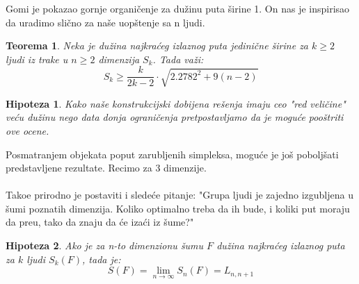 \documentclass[b1paper,portrait]{template/baposter}
\newtheorem{theorem}{Teorema}
\newtheorem*{hipoteza}{Hipoteza}
\begin{document}
\begin{poster}
{
	Gomi je pokazao gornje organi\v cenje za du\v zinu puta \v sirine 1.
	On nas je inspirisao da uradimo sli\v cno za na\v se uop\v stenje sa n ljudi.
	\begin{theorem}
		Neka je du\v zina najkra\' ceg izlaznog puta jedini\v cne \v sirine za $k\geqslant 2$ ljudi iz trake u $n\geqslant 2$ dimenzija $S_k$. Tada va\v zi:
		$$S_k\geqslant\frac{k}{2k-2}\cdot \sqrt{2.2782^2+9(n-2)}$$
	\end{theorem}
	\begin{hipoteza}
		Kako na\v se konstrukcijski dobijena re\v senja imaju ceo "red veli\v cine" ve\' cu du\v zinu nego 
		data donja ograni\v cenja pretpostavljamo da je mogu\' ce poo\v striti ove ocene. 
	\end{hipoteza}
	\vspace{0.15cm}
}

{
	Posmatranjem objekata poput zarubljenih simpleksa, mogu\' ce je jo\v s pobolj\v sati predstavljene rezultate. Recimo za 3 dimenzije.\\ \\
	Tako\dj e prirodno je postaviti i slede\' ce pitanje:
	"Grupa ljudi je zajedno izgubljena u \v sumi poznatih dimenzija. Koliko optimalno treba da ih bude,
	i koliki put moraju da pre\dj u, tako da znaju da \' ce iza\' ci iz \v sume?"
	\begin{hipoteza}
		Ako je za n-to dimenzionu \v sumu $F$ du\v zina najkra\' ceg izlaznog puta za $k$ ljudi $S_k(F)$, tada je:
		$$S(F)=\lim_{n \to \infty} S_n(F) = L_{n,n+1}$$
	\end{hipoteza}
	\vspace{0.15cm}
}

\end{poster}
\end{document}
